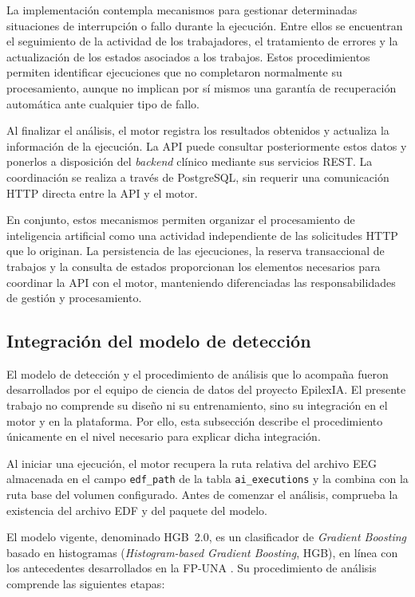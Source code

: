 La implementación contempla mecanismos
para gestionar determinadas situaciones
de interrupción o fallo durante la ejecución.
Entre ellos se encuentran el seguimiento
de la actividad de los trabajadores,
el tratamiento de errores y la actualización
de los estados asociados a los trabajos.
Estos procedimientos permiten identificar
ejecuciones que no completaron normalmente
su procesamiento, aunque no implican
por sí mismos una garantía de recuperación
automática ante cualquier tipo de fallo.

Al finalizar el análisis, el motor registra
los resultados obtenidos y actualiza
la información de la ejecución. La API
puede consultar posteriormente estos
datos y ponerlos a disposición del
\textit{backend} clínico mediante sus servicios
REST. La coordinación se realiza a través
de PostgreSQL, sin requerir una comunicación
HTTP directa entre la API y el motor.


En conjunto, estos mecanismos permiten
organizar el procesamiento de inteligencia
artificial como una actividad independiente
de las solicitudes HTTP que lo originan.
La persistencia de las ejecuciones,
la reserva transaccional de trabajos
y la consulta de estados proporcionan
los elementos necesarios para coordinar
la API con el motor, manteniendo
diferenciadas las responsabilidades
de gestión y procesamiento.


\subsection{Integración del modelo de detección}
\label{subsec:modelo-vigente-hgb}

El modelo de detección y el procedimiento de análisis que lo acompaña fueron desarrollados por el equipo de ciencia de datos del proyecto EpilexIA.
El presente trabajo no comprende su diseño ni su entrenamiento, sino su integración en el motor y en la plataforma.
Por ello, esta subsección describe el procedimiento únicamente en el nivel necesario para explicar dicha integración.

Al iniciar una ejecución, el motor recupera la ruta relativa del archivo EEG almacenada en el campo \texttt{edf\_path} de la tabla \texttt{ai\_executions} y la combina con la ruta base del volumen configurado.
Antes de comenzar el análisis, comprueba la existencia del archivo EDF y del paquete del modelo.

El modelo vigente, denominado HGB~2.0, es un clasificador de \textit{Gradient Boosting} basado en histogramas (\textit{Histogram-based Gradient Boosting}, HGB), en línea con los antecedentes desarrollados en la FP-UNA \citep{Lezcano2026GradientBoosting}.
Su procedimiento de análisis comprende las siguientes etapas:

